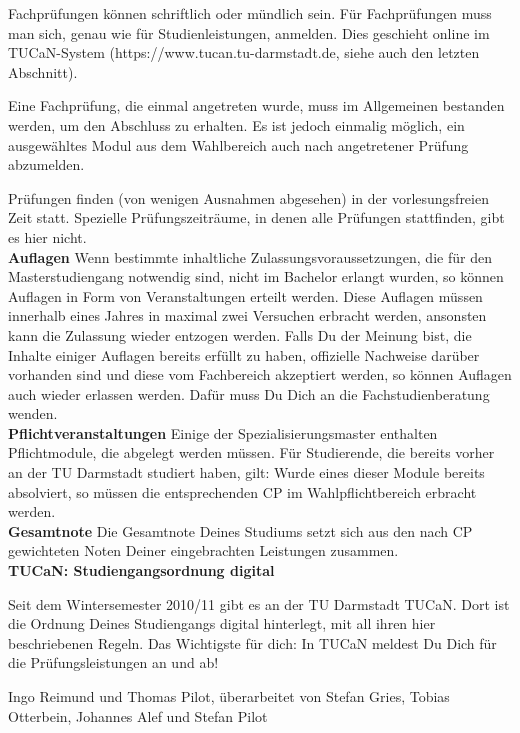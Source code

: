 {

Fachprüfungen können schriftlich oder mündlich sein. Für Fachprüfungen muss man sich, genau wie für Studienleistungen, anmelden. Dies geschieht online im TUCaN-System (https://www.tucan.tu-darmstadt.de, siehe auch den letzten Abschnitt).

Eine Fachprüfung, die einmal angetreten wurde, muss im Allgemeinen bestanden werden, um den Abschluss zu erhalten. Es ist jedoch einmalig möglich, ein ausgewähltes Modul aus dem Wahlbereich auch nach angetretener Prüfung abzumelden.

Prüfungen finden (von wenigen Ausnahmen abgesehen) in der vorlesungsfreien Zeit statt. Spezielle Prüfungszeiträume, in denen alle Prüfungen stattfinden, gibt es hier nicht.\\


\noindent\textbf{Auflagen}
Wenn bestimmte inhaltliche Zulassungsvoraussetzungen, die für den Masterstudiengang notwendig sind, nicht im Bachelor erlangt wurden, so können Auflagen in Form von Veranstaltungen erteilt werden. Diese Auflagen müssen innerhalb eines Jahres in maximal zwei Versuchen erbracht werden, ansonsten kann die Zulassung wieder entzogen werden. Falls Du der Meinung bist, die Inhalte einiger Auflagen bereits erfüllt zu haben, offizielle Nachweise darüber vorhanden sind und diese vom Fachbereich akzeptiert werden, so können Auflagen auch wieder erlassen werden. Dafür muss Du Dich an die Fachstudienberatung wenden.\\


\noindent\textbf{Pflichtveranstaltungen}
Einige der Spezialisierungsmaster enthalten Pflichtmodule, die abgelegt werden müssen. Für Studierende, die bereits vorher an der TU Darmstadt studiert haben, gilt: Wurde eines dieser Module bereits absolviert, so müssen die entsprechenden CP im Wahlpflichtbereich erbracht werden.\\

\noindent\textbf{Gesamtnote}
Die Gesamtnote Deines Studiums setzt sich aus den nach CP gewichteten Noten Deiner eingebrachten Leistungen zusammen.\\


\noindent\textbf{TUCaN: Studiengangsordnung digital}

Seit dem Wintersemester 2010/11 gibt es an der TU Darmstadt TUCaN. Dort ist die Ordnung Deines Studiengangs digital hinterlegt, mit all ihren hier beschriebenen Regeln. Das Wichtigste für dich: In TUCaN meldest Du Dich für die Prüfungsleistungen an und ab!
}
{Ingo Reimund und Thomas Pilot, überarbeitet von Stefan Gries, Tobias Otterbein, Johannes Alef und Stefan Pilot}

